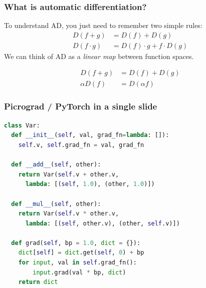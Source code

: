 \documentclass{beamer}
\begin{document}
    \begin{frame}
        \frametitle{What is automatic differentiation?}
        To understand AD, you just need to remember two simple rules:
        \begin{align*}
            D(f + g) &= D(f) + D(g) \\
            D(f \cdot g) &= D(f) \cdot g + f \cdot D(g)
        \end{align*}
        We can think of AD as a \textit{linear map} between function spaces.

        \begin{align*}
            D(f + g) &= D(f) + D(g) \\
            \alpha D(f) &= D(\alpha f)
        \end{align*}
    \end{frame}

    \begin{frame}[fragile]
        \frametitle{Picrograd / PyTorch in a single slide}
        \begin{lstlisting}[language=Python, linewidth=1.1\linewidth]
class Var:
  def __init__(self, val, grad_fn=lambda: []):
    self.v, self.grad_fn = val, grad_fn

  def __add__(self, other):
    return Var(self.v + other.v,
      lambda: [(self, 1.0), (other, 1.0)])

  def __mul__(self, other):
    return Var(self.v * other.v,
      lambda: [(self, other.v), (other, self.v)])

  def grad(self, bp = 1.0, dict = {}):
    dict[self] = dict.get(self, 0) + bp
    for input, val in self.grad_fn():
        input.grad(val * bp, dict)
    return dict
        \end{lstlisting}
    \end{frame}
\end{document}
